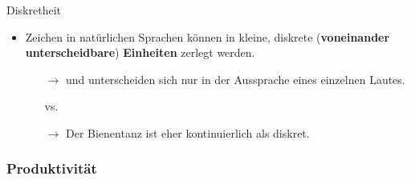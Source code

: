 \begin{frame}{Diskretheit}
			
	\begin{itemize}
		\item Zeichen in natürlichen Sprachen können in kleine, diskrete (\textbf{voneinander unterscheidbare}) \textbf{Einheiten} zerlegt werden.

\pause
				
		\begin{itemize}
			\item[]
			\item[$\rightarrow$]  und  unterscheiden sich nur in der Aussprache eines einzelnen Lautes.
			
			\ea \textipa{[\textglotstop{}al}{\red b}\textipa{@n]} vs. \textipa{[\textglotstop{}al}{\red p}\textipa{@n]}
			\z 
			
			\item[$\rightarrow$] Der Bienentanz ist eher kontinuierlich als diskret.						
		\end{itemize}
	
	\end{itemize}

\end{frame}


\subsubsection{Produktivität}

